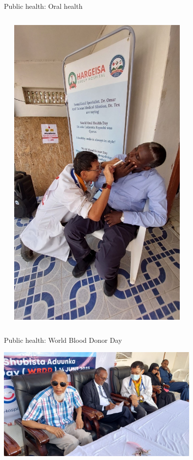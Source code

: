 \documentclass[aspectratio=169]{beamer}
\begin{document}
\begin{frame}{Public health: Oral health}
    \begin{columns}
        
        \begin{center}
        
            
        \end{center}
        \includegraphics[width=0.7\textwidth]{IMG-4368.JPG}
    \end{columns}
\end{frame}




\begin{frame}{Public health: World Blood Donor Day}
    \begin{center}
        
        \includegraphics[width=0.75\textwidth]{IMG-4378.JPG}
    \end{center}
\end{frame}
\end{document}
